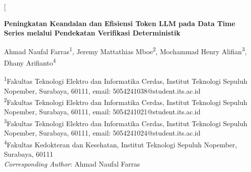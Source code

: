 \documentclass[10pt,a4paper,twocolumn]{article}
\begin{document}
\twocolumn[{%
\begin{@twocolumnfalse}
\thispagestyle{fancy}
\vspace{0.5em}
\begin{center}
  {\LARGE\bfseries Peningkatan Keandalan dan Efisiensi Token LLM pada Data
   Time Series melalui Pendekatan Verifikasi Deterministik\par}
  \vspace{1.2em}
  {\normalsize Ahmad Naufal Farras\textsuperscript{1}, Jeremy Mattathias
   Mboe\textsuperscript{2}, Mochammad Henry Alifian\textsuperscript{3},
   Dhany Arifianto\textsuperscript{4}\par}
  \vspace{0.6em}
  {\footnotesize
   \textsuperscript{1}Fakultas Teknologi Elektro dan Informatika Cerdas,
   Institut Teknologi Sepuluh Nopember, Surabaya, 60111,
   email: 5054241038@student.its.ac.id\\
   \textsuperscript{2}Fakultas Teknologi Elektro dan Informatika Cerdas,
   Institut Teknologi Sepuluh Nopember, Surabaya, 60111,
   email: 5054241021@student.its.ac.id\\
   \textsuperscript{3}Fakultas Teknologi Elektro dan Informatika Cerdas,
   Institut Teknologi Sepuluh Nopember, Surabaya, 60111,
   email: 5054241024@student.its.ac.id\\
   \textsuperscript{4}Fakultas Kedokteran dan Kesehatan,
   Institut Teknologi Sepuluh Nopember, Surabaya, 60111\\[0.3em]
   \textit{Corresponding Author}: Ahmad Naufal Farras\par}
\end{center}
\vspace{1.0em}


\end{@twocolumnfalse}}
\end{document}
